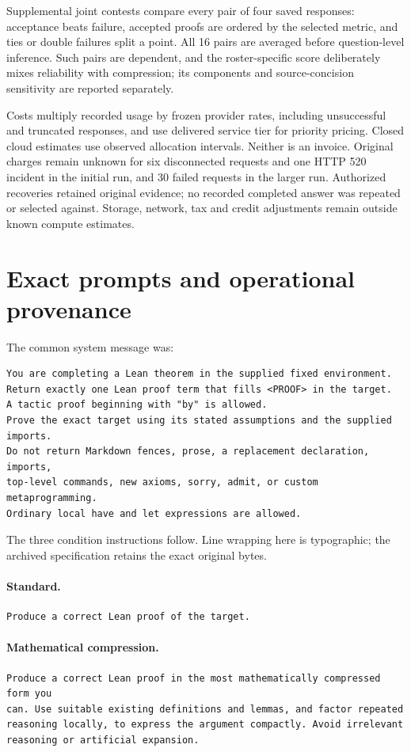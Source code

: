 Supplemental joint contests compare every pair of four saved responses: acceptance beats failure, accepted proofs are ordered by the selected metric, and ties or double failures split a point. All 16 pairs are averaged before question-level inference. Such pairs are dependent, and the roster-specific score deliberately mixes reliability with compression; its components and source-concision sensitivity are reported separately.

Costs multiply recorded usage by frozen provider rates, including unsuccessful and truncated responses, and use delivered service tier for priority pricing. Closed cloud estimates use observed allocation intervals. Neither is an invoice. Original charges remain unknown for six disconnected requests and one HTTP 520 incident in the initial run, and 30 failed requests in the larger run. Authorized recoveries retained original evidence; no recorded completed answer was repeated or selected against. Storage, network, tax and credit adjustments remain outside known compute estimates.

\section{Exact prompts and operational provenance}
\label{app:exact-prompts}

The common system message was:
\begin{verbatim}
You are completing a Lean theorem in the supplied fixed environment.
Return exactly one Lean proof term that fills <PROOF> in the target.
A tactic proof beginning with "by" is allowed.
Prove the exact target using its stated assumptions and the supplied imports.
Do not return Markdown fences, prose, a replacement declaration, imports,
top-level commands, new axioms, sorry, admit, or custom metaprogramming.
Ordinary local have and let expressions are allowed.
\end{verbatim}
The three condition instructions follow. Line wrapping here is typographic; the archived specification retains the exact original bytes.

\paragraph{Standard.}
\begin{verbatim}
Produce a correct Lean proof of the target.
\end{verbatim}
\paragraph{Mathematical compression.}
\begin{verbatim}
Produce a correct Lean proof in the most mathematically compressed form you
can. Use suitable existing definitions and lemmas, and factor repeated
reasoning locally, to express the argument compactly. Avoid irrelevant
reasoning or artificial expansion.
\end{verbatim}
